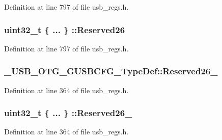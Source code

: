 Definition at line 797 of file usb\-\_\-regs.\-h.

\hypertarget{group___u_s_b___o_t_g___d_r_i_v_e_r_ga7f05c3c943ce66948236354fdf160d22}{
\subsubsection[{Reserved26}]{\setlength{\rightskip}{0pt plus 5cm}uint32\-\_\-t \{ ... \} \-::Reserved26}}\label{group___u_s_b___o_t_g___d_r_i_v_e_r_ga7f05c3c943ce66948236354fdf160d22}


Definition at line 797 of file usb\-\_\-regs.\-h.

\hypertarget{group___u_s_b___o_t_g___d_r_i_v_e_r_ga3a67acf742f6ed9acbfd3a181ab5bb92}{
\subsubsection[{Reserved26\-\_\-28}]{ \-\_\-\-U\-S\-B\-\_\-\-O\-T\-G\-\_\-\-G\-U\-S\-B\-C\-F\-G\-\_\-\-Type\-Def\-::\-Reserved26\-\_}}\label{group___u_s_b___o_t_g___d_r_i_v_e_r_ga3a67acf742f6ed9acbfd3a181ab5bb92}


Definition at line 364 of file usb\-\_\-regs.\-h.

\hypertarget{group___u_s_b___o_t_g___d_r_i_v_e_r_ga4178aa7ff842b73f8a53e853d871fb0f}{
\subsubsection[{Reserved26\-\_\-28}]{\setlength{\rightskip}{0pt plus 5cm}uint32\-\_\-t \{ ... \} \-::Reserved26\-\_}}\label{group___u_s_b___o_t_g___d_r_i_v_e_r_ga4178aa7ff842b73f8a53e853d871fb0f}


Definition at line 364 of file usb\-\_\-regs.\-h.

